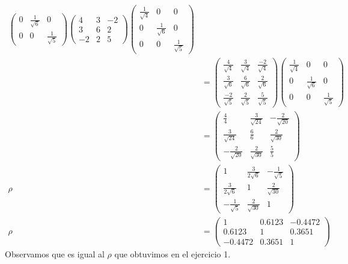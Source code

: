 \begin{sol}
\begin{align*}
\begin{pmatrix}
0 &\frac{1}{\sqrt{6}} & 0 \\
 0 & 0 & \frac{1}{\sqrt{5}}
\end{pmatrix}
\begin{pmatrix}
4&3&-2\\
3&6&2\\
-2&2&5
\end{pmatrix}
\begin{pmatrix}
\frac{1}{\sqrt{4}} & 0 & 0 \\
0 &\frac{1}{\sqrt{6}} & 0 \\
 0 & 0 & \frac{1}{\sqrt{5}}
\end{pmatrix}\\
&= \begin{pmatrix}
\frac{4}{\sqrt{4}} & \frac{3}{\sqrt{4}} & \frac{-2}{\sqrt{4}} \\
\frac{3}{\sqrt{6}} & \frac{6}{\sqrt{6}} & \frac{2}{\sqrt{6}} \\
\frac{-2}{\sqrt{5}} & \frac{2}{\sqrt{5}} & \frac{5}{\sqrt{5}}
\end{pmatrix}
\begin{pmatrix}
\frac{1}{\sqrt{4}} & 0 & 0 \\
0 &\frac{1}{\sqrt{6}} & 0 \\
 0 & 0 & \frac{1}{\sqrt{5}}
\end{pmatrix}\\
&= \begin{pmatrix}
\frac{4}{4} & \frac{3}{\sqrt{24}} & -\frac{2}{\sqrt{20}} \\
\frac{3}{\sqrt{24}} & \frac{6}{6} & \frac{2}{\sqrt{30}} \\
-\frac{2}{\sqrt{20}} & \frac{2}{\sqrt{30}} & \frac{5}{5}
\end{pmatrix}\\
\rho &= \begin{pmatrix}
1 & \frac{3}{2\sqrt{6}} & -\frac{1}{\sqrt{5}} \\
\frac{3}{2\sqrt{6}} & 1 & \frac{2}{\sqrt{30}} \\
-\frac{1}{\sqrt{5}} & \frac{2}{\sqrt{30}} & 1
\end{pmatrix}\\
\rho &= 
\begin{pmatrix}
1 & 0.6123 & -0.4472 \\
0.6123 & 1 & 0.3651 \\
-0.4472 &  0.3651 & 1
\end{pmatrix}
\end{align*}
Observamos que es igual al $\rho$ que obtuvimos en el ejercicio 1.\\\\

\end{sol}
